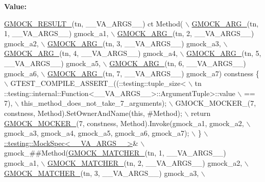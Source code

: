 {\bfseries Value\+:}
\begin{DoxyCode}
\hyperlink{gmock-generated-function-mockers_8h_a0e9d94e9c77df84f1103af06feee1077}{GMOCK\_RESULT\_}(tn, \_\_VA\_ARGS\_\_) ct Method( \(\backslash\)
      \hyperlink{gmock-generated-function-mockers_8h_a887575cc1c31158fba808180a10c004f}{GMOCK\_ARG\_}(tn, 1, \_\_VA\_ARGS\_\_) gmock\_a1, \(\backslash\)
      \hyperlink{gmock-generated-function-mockers_8h_a887575cc1c31158fba808180a10c004f}{GMOCK\_ARG\_}(tn, 2, \_\_VA\_ARGS\_\_) gmock\_a2, \(\backslash\)
      \hyperlink{gmock-generated-function-mockers_8h_a887575cc1c31158fba808180a10c004f}{GMOCK\_ARG\_}(tn, 3, \_\_VA\_ARGS\_\_) gmock\_a3, \(\backslash\)
      \hyperlink{gmock-generated-function-mockers_8h_a887575cc1c31158fba808180a10c004f}{GMOCK\_ARG\_}(tn, 4, \_\_VA\_ARGS\_\_) gmock\_a4, \(\backslash\)
      \hyperlink{gmock-generated-function-mockers_8h_a887575cc1c31158fba808180a10c004f}{GMOCK\_ARG\_}(tn, 5, \_\_VA\_ARGS\_\_) gmock\_a5, \(\backslash\)
      \hyperlink{gmock-generated-function-mockers_8h_a887575cc1c31158fba808180a10c004f}{GMOCK\_ARG\_}(tn, 6, \_\_VA\_ARGS\_\_) gmock\_a6, \(\backslash\)
      \hyperlink{gmock-generated-function-mockers_8h_a887575cc1c31158fba808180a10c004f}{GMOCK\_ARG\_}(tn, 7, \_\_VA\_ARGS\_\_) gmock\_a7) constness \{ \(\backslash\)
    GTEST\_COMPILE\_ASSERT\_((::testing::tuple\_size<                          \(\backslash\)
        tn ::testing::internal::Function<\_\_VA\_ARGS\_\_>::ArgumentTuple>::value \(\backslash\)
            == 7), \(\backslash\)
        this\_method\_does\_not\_take\_7\_arguments); \(\backslash\)
    GMOCK\_MOCKER\_(7, constness, Method).SetOwnerAndName(\textcolor{keyword}{this}, #Method); \(\backslash\)
    return \hyperlink{gmock-generated-function-mockers_8h_a7d362499e27b1bc3a9806dd3cf58a5b7}{GMOCK\_MOCKER\_}(7, constness, Method).Invoke(gmock\_a1, gmock\_a2, \(\backslash\)
        gmock\_a3, gmock\_a4, gmock\_a5, gmock\_a6, gmock\_a7); \(\backslash\)
  \} \(\backslash\)
  \hyperlink{classtesting_1_1internal_1_1MockSpec}{::testing::MockSpec<\_\_VA\_ARGS\_\_>}& \(\backslash\)
      gmock\_##Method(\hyperlink{gmock-generated-function-mockers_8h_aa87d0009fe91f1c89d658776b55a769c}{GMOCK\_MATCHER\_}(tn, 1, \_\_VA\_ARGS\_\_) gmock\_a1, \(\backslash\)
                     \hyperlink{gmock-generated-function-mockers_8h_aa87d0009fe91f1c89d658776b55a769c}{GMOCK\_MATCHER\_}(tn, 2, \_\_VA\_ARGS\_\_) gmock\_a2, \(\backslash\)
                     \hyperlink{gmock-generated-function-mockers_8h_aa87d0009fe91f1c89d658776b55a769c}{GMOCK\_MATCHER\_}(tn, 3, \_\_VA\_ARGS\_\_) gmock\_a3, \(\backslash\)

\end{DoxyCode}
